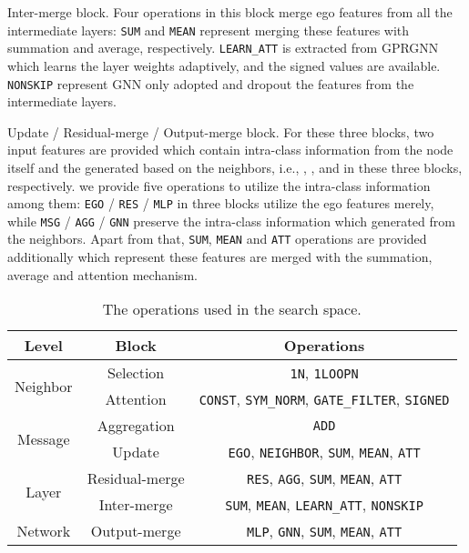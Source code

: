 \documentclass[sigconf]{acmart}
\begin{document}
 Inter-merge block. Four operations in this block merge ego features from all the intermediate layers: \texttt{SUM} and \texttt{MEAN} represent merging these features with summation and average, respectively. \texttt{LEARN\_ATT} is extracted from GPRGNN~\cite{chien2020adaptive} which learns the layer weights adaptively, and the signed values are available. \texttt{NONSKIP} represent GNN only adopted  and dropout the features from the intermediate layers.




 Update / Residual-merge / Output-merge block. For these three blocks, two input features are provided which contain intra-class information from the node itself and the generated based on the neighbors, i.e., , , and  in these three blocks, respectively.
we provide five operations to utilize the intra-class information among them: \texttt{EGO} / \texttt{RES} / \texttt{MLP} in three blocks utilize the ego features merely, while \texttt{MSG} / \texttt{AGG} / \texttt{GNN} preserve the intra-class information which generated from the neighbors. Apart from that, \texttt{SUM}, \texttt{MEAN} and \texttt{ATT} operations are provided additionally which represent these features are merged with the summation, average and attention mechanism.





\begin{table}[]
	\footnotesize
	\caption{The operations used in the search space. }
\begin{tabular}{c|c|c}
	\hline
	Level & Block                          & Operations                                                                 \\ \hline
	\multirow{2}{*}{Neighbor} & Selection        & \texttt{1N}, \texttt{1LOOPN}                                               \\ \cline{2-3} 
	& Attention       & \texttt{CONST}, \texttt{SYM\_NORM}, \texttt{GATE\_FILTER}, \texttt{SIGNED} \\ \hline
	\multirow{2}{*}{Message}  
	& Aggregation    & \texttt{ADD}                                                               \\ \cline{2-3} 
	& Update       & \texttt{EGO}, \texttt{NEIGHBOR}, \texttt{SUM}, \texttt{MEAN}, \texttt{ATT} \\ \hline
	\multirow{2}{*}{Layer}    
	& Residual-merge   & \texttt{RES}, \texttt{AGG}, \texttt{SUM}, \texttt{MEAN}, \texttt{ATT}      \\ \cline{2-3} 
	& Inter-merge                        & \texttt{SUM}, \texttt{MEAN}, \texttt{LEARN\_ATT}, \texttt{NONSKIP}         \\ \hline
	Network                   & Output-merge                       & \texttt{MLP}, \texttt{GNN}, \texttt{SUM}, \texttt{MEAN}, \texttt{ATT}      \\ \hline
\end{tabular}
\label{tb-search-space}
\end{table}
\end{document}
